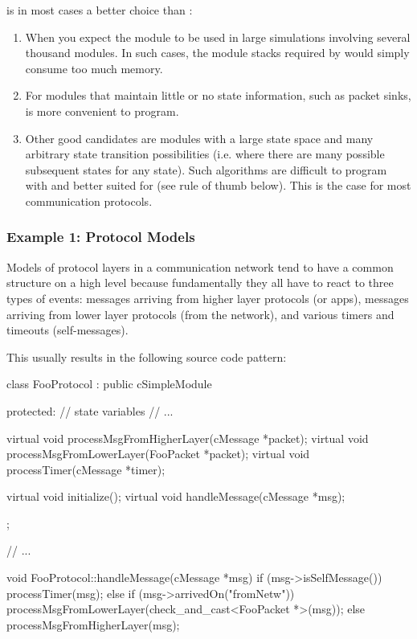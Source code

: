  is in most cases a better choice than :

\begin{enumerate}
  \item When you expect the module to be used in large simulations
      involving several thousand modules. In such cases, the module stacks
      required by  would simply consume too much memory.
  \item For modules that maintain little or no state information,
      such as packet sinks,  is more convenient to program.
  \item Other good candidates are modules with a large state space and
      many arbitrary state transition possibilities (i.e. where there
      are many possible subsequent states for any state). Such algorithms
      are difficult to program with  and
      better suited for  (see rule of thumb
      below). This is the case for most communication protocols.
\end{enumerate}


\subsubsection{Example 1: Protocol Models}
\label{sec:simple-modules:handlemessage:protocol-model-example}

Models of protocol layers in a communication network tend to have
a common structure on a high level because fundamentally they all have to react
to three types of events: messages arriving from higher layer protocols
(or apps), messages arriving from lower layer protocols (from the network),
and various timers and timeouts (self-messages).

This usually results in the following source code pattern:

\begin{cpp}
class FooProtocol : public cSimpleModule
{
  protected:
    // state variables
    // ...

    virtual void processMsgFromHigherLayer(cMessage *packet);
    virtual void processMsgFromLowerLayer(FooPacket *packet);
    virtual void processTimer(cMessage *timer);

    virtual void initialize();
    virtual void handleMessage(cMessage *msg);
};

// ...

void FooProtocol::handleMessage(cMessage *msg)
{
    if (msg->isSelfMessage())
        processTimer(msg);
    else if (msg->arrivedOn("fromNetw"))
        processMsgFromLowerLayer(check_and_cast<FooPacket *>(msg));
    else
        processMsgFromHigherLayer(msg);
}
\end{cpp}

